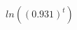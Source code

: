 \documentclass[preview]{standalone}
\begin{document}
\begin{align*}
ln((0.931)^t)
\end{align*}
\end{document}
